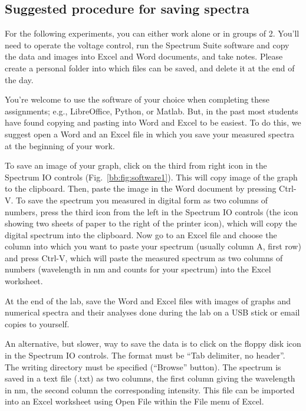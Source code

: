 \subsection{Suggested procedure for saving spectra}
For the following experiments, you can either work alone or in groups of 2. You'll need to operate the voltage control, run the Spectrum Suite software and copy the data and images into Excel and Word documents, and take notes.  Please create a personal folder into which files can be saved, and delete it at the end of the day.

You're welcome to use the software of your choice when completing these assignments; e.g., LibreOffice, Python, or Matlab.  But, in the past most students have found copying and pasting into Word and Excel to be easiest.  To do this, we suggest open a Word and an Excel file in which you save your measured spectra at the beginning of your work.

To save an image of your graph, click on the third from right icon in the Spectrum IO controls (Fig.~\ref{bb:fig:software1}). This will copy image of the graph to the clipboard. Then, paste the image in the Word document by pressing Ctrl-V. To save the spectrum you measured in digital form as two columns of numbers, press the third icon from the left in the Spectrum IO controls (the icon showing two sheets of paper to the right of the printer icon), which will copy the digital spectrum into the clipboard. Now go to an Excel file and choose the column into which you want to paste your spectrum (usually column A, first row) and press Ctrl-V, which will paste the measured spectrum as two columns of numbers (wavelength in nm and counts for your spectrum) into the Excel worksheet.

At the end of the lab, save the Word and Excel files with images of graphs and numerical spectra and their analyses done during the lab on a USB stick or email copies to yourself.  

An alternative, but slower, way to save the data is to click on the floppy disk icon in the Spectrum IO controls. The format must be “Tab delimiter, no header”. The writing directory must be specified (“Browse” button). The spectrum is saved in a text file (.txt) as two columns, the first column giving the wavelength in nm, the second column the corresponding intensity. This file can be imported into an Excel worksheet using Open File within the File menu of Excel.
